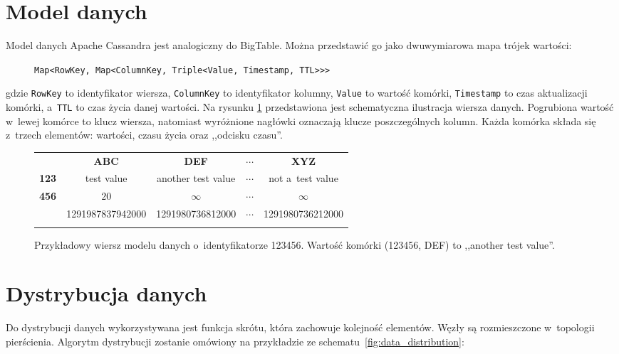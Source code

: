 \section{Model danych}
\label{sec:cassandra_data_model}

Model danych Apache Cassandra jest analogiczny do BigTable. \cite{official_bigtable} Można przedstawić go jako dwuwymiarowa mapa trójek wartości:

\begin{figure}[ht!]
	\centering
	\verb+Map<RowKey, Map<ColumnKey, Triple<Value, Timestamp, TTL>>>+
\end{figure}

gdzie \verb+RowKey+ to identyfikator wiersza, \verb+ColumnKey+ to identyfikator kolumny, \verb+Value+ to wartość komórki, \verb+Timestamp+ to czas aktualizacji komórki, a~\verb+TTL+ to czas życia danej wartości. \cite{mc_fadin_long_live_data_model} Na rysunku \ref{fig:data_model_example} przedstawiona jest schematyczna ilustracja wiersza danych. Pogrubiona wartość w~lewej komórce to klucz wiersza, natomiast wyróżnione nagłówki oznaczają klucze poszczególnych kolumn. Każda komórka składa się z~trzech elementów: wartości, czasu życia oraz ,,odcisku czasu''.

\begin{figure}[ht!]
	\centering
	\begin{tabular}{|l||c|c|c|c|}
		\hhline{|-||----|}
		& \textbf{ABC} & \textbf{DEF} & $\cdots$ & \textbf{XYZ} \\
		\hhline{|~||====|}
		\textbf{123} & test value & another test value & $\cdots$ & not a~test value \\
		\cline{2-5}
		\textbf{456} & $20$ & $\infty$ & $\cdots$ & $\infty$ \\
		\cline{2-5}
		& 1291987837942000 & 1291980736812000 & $\cdots$ & 1291980736212000 \\
		\hhline{|-||----|}
	\end{tabular}

	\caption{Przykładowy wiersz modelu danych o~identyfikatorze 123456. Wartość komórki (123456, DEF) to ,,another test value''.}
	\label{fig:data_model_example}
\end{figure}

\section{Dystrybucja danych}
\label{sec:cassandra_data_distribution}

Do dystrybucji danych wykorzystywana jest funkcja skrótu, która zachowuje kolejność elementów. Węzły są rozmieszczone w~topologii pierścienia. Algorytm dystrybucji zostanie omówiony na przykładzie ze schematu~\ref{fig:data_distribution}: 

